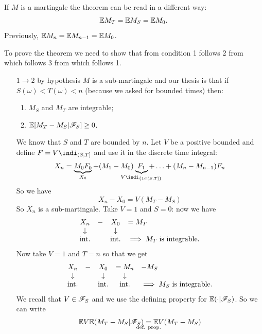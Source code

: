 \documentclass{report}
\begin{document}
\begin{remark}
	If $M$ is a martingale the theorem can be read in a different way:
	\begin{equation*}
		\mathbb{E} M_{T}=\mathbb{E} M_{S}=\mathbb{E} M_{0}.
	\end{equation*}
	Previously, $\mathbb{E} M_{n}=\mathbb{E} M_{n-1}=\mathbb{E} M_{0}$.
\end{remark}
\begin{fancyproof}
	To prove the theorem we need to show that from condition 1 follows 2 from which follows 3 from which follows 1.
	\begin{enumerate}
		\item[$1\to 2$] by hypothesis $M$ is a sub-martingale and our thesis is that if $S(\omega)<T(\omega)<n$ (because we asked for bounded times) then:
		\begin{enumerate}
			\item $M_{S}$ and $M_{T}$ are integrable;
			\item $\mathbb{E}[M_{T}-M_{S}|\mathscr{F}_{S}]\geq0$.
		\end{enumerate}
		We know that $S$ and $T$ are bounded by $n$. Let $V$ be a positive bounded \rv{} and define $F=V\indi_{(S,T]}$ and use it in the discrete time integral:
		\[X_{n}=\underbrace{M_0F_0}_{X_0}+(M_1-M_0)\underbrace{F_1}_{\mathclap{V\indi_{\{1\in(S,T]\}}}}+\ldots+(M_{n}-M_{n-1})F_{n}\]
		So we have 
		\[X_{n}-X_{0}=V(M_{T}-M_{S})\]
		So $X_{n}$ is a sub-martingale. Take $V=1$ and $S=0$: now we have
		\begin{equation*}
			\begin{array}{c c c l}
				X_{n}&-&X_{0}&=M_{T}\\
				\downarrow&&\downarrow&\\
				\text{int.}&&\text{int.}&\implies M_{T}\text{ is integrable}.
			\end{array}
		\end{equation*}
		Now take $V=1$ and $T=n$ so that we get
		\begin{equation*}
			\begin{array}{c c c c l}
				X_{n}&-&X_{0}&=M_{n}&-M_{S}\\
				\downarrow&&\downarrow&\downarrow&\\
				\text{int.}&&\text{int.}&\text{int.}&\implies M_{S}\text{ is integrable}.
			\end{array}
		\end{equation*}
		We recall that $V\in\mathscr{F}_S$ and we use the defining property for $\mathbb{E}(\cdot|\mathscr{F}_S)$. So we can write
		\begin{align*}
			\ev V\ev(M_{T}-M_{S}|\F_{S})&\underset{\mathclap{\text{def. prop.}}}{=}\ev V(M_{T}-M_{S})\\

\end{align*}
\end{enumerate}
\end{fancyproof}
\end{document}
